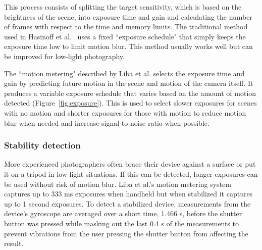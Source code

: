 \documentclass{sig-alternate}
\begin{document}
This process consists of splitting the target sensitivity, which is based on the brightness of the scene, into exposure time and gain and calculating the number of frames with respect to the time and memory limits. The traditional method used in Hasinoff et al.~\cite{Hasinoff2016} uses a fixed ``exposure schedule" that simply keeps the exposure time low to limit motion blur. This method usually works well but can be improved for low-light photography.

The ``motion metering" described by Liba et al. selects the exposure time and gain by predicting future motion in the scene and motion of the camera itself. It produces a variable exposure schedule that varies based on the amount of motion detected (Figure~\ref{fig:exposure}). This is used to select slower exposures for scenes with no motion and shorter exposures for those with motion to reduce motion blur when needed and increase signal-to-noise ratio when possible.




\subsubsection{Stability detection}

More experienced photographers often brace their device against a surface or put it on a tripod in low-light situations. If this can be detected, longer exposures can be used without risk of motion blur. Liba et al.'s motion metering system captures up to 333 ms exposures when handheld but when stabilized it captures up to 1 second exposures. To detect a stabilized device, measurements from the device's gyroscope are averaged over a short time, 1.466 s, before the shutter button was pressed while masking out the last 0.4 s of the measurements to prevent vibrations from the user pressing the shutter button from affecting the result.




\end{document}

